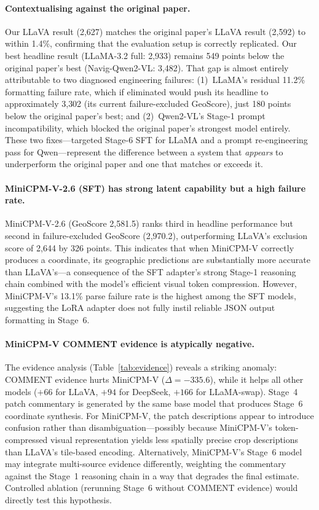 \documentclass[11pt]{article}
\begin{document}
\paragraph{Contextualising against the original paper.}
Our LLaVA result (2{,}627) matches the original paper's LLaVA result (2{,}592) to
within 1.4\%, confirming that the evaluation setup is correctly replicated. Our best
headline result (LLaMA-3.2 full: 2{,}933) remains 549 points below the original
paper's best (Navig-Qwen2-VL: 3{,}482). That gap is almost entirely attributable to
two diagnosed engineering failures: (1)~LLaMA's residual 11.2\% formatting failure
rate, which if eliminated would push its headline to approximately 3{,}302 (its current
failure-excluded GeoScore), just 180 points below the original paper's best; and
(2)~Qwen2-VL's Stage-1 prompt incompatibility, which blocked the original paper's
strongest model entirely. These two fixes---targeted Stage-6 SFT for LLaMA and a
prompt re-engineering pass for Qwen---represent the difference between a system that
\emph{appears} to underperform the original paper and one that matches or exceeds it.

\paragraph{MiniCPM-V-2.6 (SFT) has strong latent capability but a high failure rate.}
MiniCPM-V-2.6 (GeoScore 2{,}581.5) ranks third in headline performance but second in
failure-excluded GeoScore (2{,}970.2), outperforming LLaVA's exclusion score of 2{,}644
by 326 points. This indicates that when MiniCPM-V correctly produces a coordinate, its
geographic predictions are substantially more accurate than LLaVA's---a consequence of
the SFT adapter's strong Stage-1 reasoning chain combined with the model's efficient
visual token compression. However, MiniCPM-V's 13.1\% parse failure rate is the highest
among the SFT models, suggesting the LoRA adapter does not fully instil reliable JSON
output formatting in Stage~6.

\paragraph{MiniCPM-V COMMENT evidence is atypically negative.}
The evidence analysis (Table~\ref{tab:evidence}) reveals a striking anomaly: COMMENT
evidence hurts MiniCPM-V ($\Delta = -335.6$), while it helps all other models
($+66$ for LLaVA, $+94$ for DeepSeek, $+166$ for LLaMA-swap). Stage~4 patch
commentary is generated by the same base model that produces Stage~6 coordinate synthesis.
For MiniCPM-V, the patch descriptions appear to introduce confusion rather than
disambiguation---possibly because MiniCPM-V's token-compressed visual representation
yields less spatially precise crop descriptions than LLaVA's tile-based encoding.
Alternatively, MiniCPM-V's Stage~6 model may integrate multi-source evidence
differently, weighting the commentary against the Stage~1 reasoning chain in a way
that degrades the final estimate. Controlled ablation (rerunning Stage~6 without
COMMENT evidence) would directly test this hypothesis.
\end{document}
